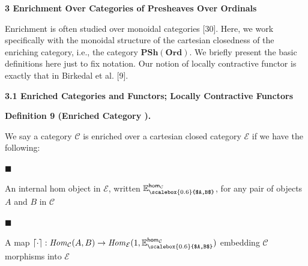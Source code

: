  
 
 


 
\par\medskip\noindent\textbf{3 Enrichment Over Categories of Presheaves Over Ordinals}\par
 
 
Enrichment is often studied over monoidal categories [30]. Here, we work specifically with the monoidal structure of the cartesian closedness of the enriching category, i.e., the category $\mathbf{PSh}(\mathbf{Ord})$. We briefly present the basic definitions here just to fix notation. Our notion of locally contractive functor is exactly that in Birkedal et al. [9].\par
 
 
 
\par\medskip\noindent\textbf{3.1 Enriched Categories and Functors; Locally Contractive Functors}\par
 
 
\par\medskip\noindent\textbf{Definition 9 (Enriched Category ).}\par
 
 
We say a category $\mathcal{C}$ is enriched over a cartesian closed category $\mathcal{E}$ if we have the following:\par
  
\par\noindent  $\blacksquare$ 
 
An internal hom object in $\mathcal{E}$, written $\mathbb{E}^{\mathsf{hom}_{\mathcal{C}}}_{\scalebox{0.6}{$A,B$}}$, for any pair of objects $A$ and $B$ in $\mathcal{C}$\par
 
 
 
\par\noindent  $\blacksquare$ 
 
A map $\left\lceil{\cdot}\right\rceil:\mathit{Hom}_{\mathcal{C}}(A,B)\to\mathit{Hom}_{\mathcal{E}}(1,\mathbb{E}^{\mathsf{hom}_{\mathcal{C}}}_{\scalebox{0.6}{$A,B$}})$ embedding $\mathcal{C}$ morphisms into $\mathcal{E}$\par
 
